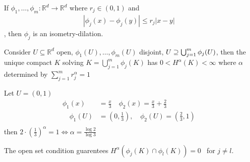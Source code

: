 \begin{theorem}
		If $\phi_1, \ldots, \phi_m: \mathbb{R}^d \to \mathbb{R}^d$ where $r_j \in (0,1)$ and 
		\begin{align*}
			|\phi_j (x) - \phi_j (y) | \leq r_{j} |x - y|
		\end{align*},
		then $\phi_j$ is an isometry-dilation.

		Consider $U \subseteq \mathbb{R}^d$ open, $\phi_1 (U), \ldots , \phi_m(U)$ disjoint,
		$U \supseteq \bigcup_{j = 1}^{m} \phi_j (U)$, then the unique compact $K$ solving $K = \bigcup_{j = 1}^{m}\phi_j (K)$ has 
		$0 < H^{\alpha}(K) < \infty$ where $\alpha$ determined by 
		$\sum_{j=1}^{m} r_{j}^{\alpha} = 1$
\end{theorem}

\begin{example}
		Let $U = (0,1)$
		\begin{align*}
			\phi_1 (x) &= \frac{x}{3} \quad \phi_{2} (x) = \frac{x}{3} + \frac{2}{3} \\
			\quad \phi_1 (U) & = (0,\frac{1}{3} ), \quad \phi_2 (U) = (\frac{2}{3}, 1) \\
		\end{align*} 
		then $2 \cdot (\frac{1}{3})^{\alpha} = 1 \iff \alpha = \frac{\log 2}{\log 3}$ 

		The open set condition guarentees $H^{\alpha}( \phi_j (K) \cap \phi_l (K)) = 0$ \,
		for $j \neq l$.
\end{example}

